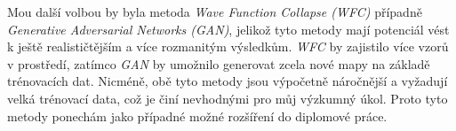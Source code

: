 Mou další volbou by byla metoda \textit{Wave Function Collapse (WFC)} případně \textit{Generative Adversarial Networks (GAN)}, jelikož tyto metody mají potenciál vést k ještě realističtějším a více rozmanitým výsledkům. \textit{WFC} by zajistilo více vzorů v prostředí, zatímco \textit{GAN} by umožnilo generovat zcela nové mapy na základě trénovacích dat. Nicméně, obě tyto metody jsou výpočetně náročnější a vyžadují velká trénovací data, což je činí nevhodnými pro můj výzkumný úkol. Proto tyto metody ponechám jako případné možné rozšíření do diplomové práce.